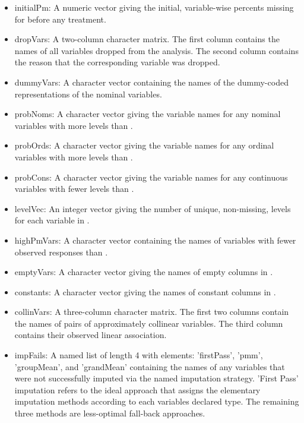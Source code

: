 \documentclass[letterpaper]{book}
\begin{document}
\begin{Value}
\begin{itemize}
\item initialPm: 
A numeric vector giving the initial, variable-wise percents
missing for  before any treatment.

\item dropVars: 
A two-column character matrix. The first column contains the names
of all variables dropped from the analysis. The second column
contains the reason that the corresponding variable was dropped.

\item dummyVars: 
A character vector containing the names of the dummy-coded
representations of the nominal variables.

\item probNoms: 
A character vector giving the variable names for any nominal
variables with more levels than .

\item probOrds: 
A character vector giving the variable names for any ordinal
variables with more levels than .

\item probCons: 
A character vector giving the variable names for any continuous
variables with fewer levels than .

\item levelVec: 
An integer vector giving the number of unique, non-missing, levels
for each variable in .

\item highPmVars: 
A character vector containing the names of variables with fewer
observed responses than .

\item emptyVars: 
A character vector giving the names of empty columns in
.

\item constants: 
A character vector giving the names of constant columns in
.

\item collinVars: 
A three-column character matrix. The first two columns contain the
names of pairs of approximately collinear variables. The third
column contains their observed linear association.

\item impFails: 
A named list of length 4 with elements: 'firstPass', 'pmm',
'groupMean', and 'grandMean' containing the names of any variables
that were not successfully imputed via the named imputation
strategy. 'First Pass' imputation refers to the ideal approach
that assigns the elementary imputation methods according to each
variables declared type. The remaining three methods are
less-optimal fall-back approaches. 


\end{itemize}
\end{Value}
\end{document}
